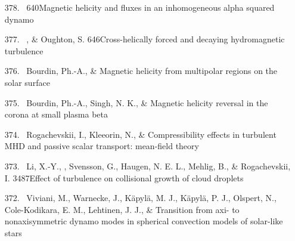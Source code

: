 \begin{itemize}
\item[{378.}~]
\Brandenburg{}
{640}{Magnetic helicity and fluxes in an inhomogeneous alpha squared dynamo}

\item[{377.}~]
\Brandenburg, \& Oughton, S.
{646}{Cross-helically forced and decaying hydromagnetic turbulence}

\item[{376.}~]
Bourdin, Ph.-A., \& \Brandenburg{}
{Magnetic helicity from multipolar regions on the solar surface}

\item[{375.}~]
Bourdin, Ph.-A., Singh, N. K., \& \Brandenburg{}
{Magnetic helicity reversal in the corona at small plasma beta}

\item[{374.}~]
Rogachevskii, I., Kleeorin, N., \& \Brandenburg{}
{Compressibility effects in turbulent MHD and passive scalar transport: mean-field theory}

\item[{373.}~]
Li, X.-Y., \Brandenburg, Svensson, G., Haugen, N. E. L., Mehlig, B., \& Rogachevskii, I.
{3487}{Effect of turbulence on collisional growth of cloud droplets}

\item[{372.}~]
Viviani, M., Warnecke, J., K\"apyl\"a, M. J., K\"apyl\"a, P. J., Olspert, N., Cole-Kodikara, E. M., Lehtinen, J. J., \& \Brandenburg{}
{Transition from axi- to nonaxisymmetric dynamo modes in spherical convection models of solar-like stars}


\end{itemize}
